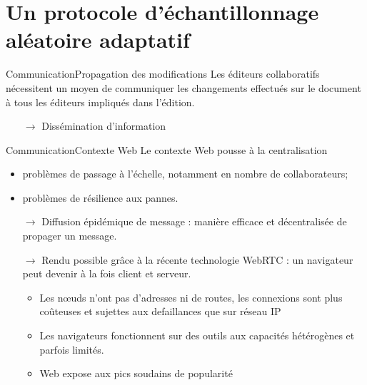 \section{Un protocole d'échantillonnage aléatoire adaptatif}

\begin{frame}{Communication}{Propagation des modifications}
  Les éditeurs collaboratifs nécessitent un moyen de communiquer les changements
  effectués sur le document à tous les éditeurs impliqués dans l'édition.
  
  \vspace{0.5cm}


  \large
  \begin{itemize}
  \item [$\rightarrow$] Dissémination d'information
  \end{itemize}
  \vspace{0.5cm}
\end{frame}


\begin{frame}{Communication}{Contexte Web}
  Le contexte Web pousse à la centralisation
  \begin{itemize}
  \item problèmes de passage à l'échelle, notamment en nombre de collaborateurs;
  \item problèmes de résilience aux pannes.
  \end{itemize}

  \vspace{0.5cm}

  \begin{itemize}
  \item [$\rightarrow$] Diffusion épidémique de message : manière efficace et
    décentralisée de propager un message.
  \item [$\rightarrow$] Rendu possible grâce à la récente technologie WebRTC :
    un navigateur peut devenir à la fois client et serveur.
    \begin{itemize}
    \item Les nœuds n'ont pas d'adresses ni de routes, les connexions sont plus
      coûteuses et sujettes aux defaillances que sur réseau IP
    \item Les navigateurs fonctionnent sur des outils aux capacités hétérogènes
      et parfois limités.
    \item Web expose aux pics soudains de popularité
    \end{itemize}
  \end{itemize}
  

\end{frame}

